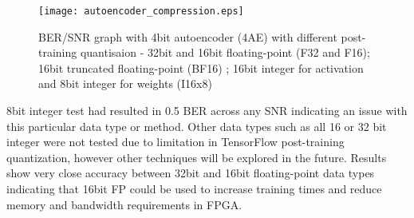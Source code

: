         \begin{figure}[H]
        	\centering
        	\texttt{[image: autoencoder\_compression.eps]}
        	\caption{BER/SNR graph with 4bit autoencoder (4AE) with different post-training quantisaion - 32bit and 16bit floating-point (F32 and F16); 16bit truncated floating-point (BF16) \autocite{bfloat16}; 16bit integer for activation and 8bit integer for weights (I16x8) \autocite{i16x8}}
        	\label{fig:autoenc_quant}
        \end{figure}
        
    	8bit integer test had resulted in 0.5 BER across any SNR indicating an issue with this particular data type or method. Other data types such as all 16 or 32 bit integer were not tested due to limitation in TensorFlow post-training quantization, however other techniques will be explored in the future. Results show very close accuracy between 32bit and 16bit floating-point data types indicating that 16bit FP could be used to increase training times and reduce memory and bandwidth requirements in FPGA.
    
